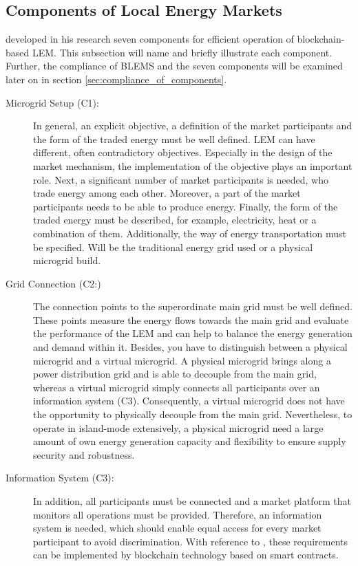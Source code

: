 \subsection{Components of Local Energy Markets}
\label{sec:components_of_local_energy_markets}
 developed in his research seven components for efficient
operation of blockchain-based LEM. This subsection will name and briefly 
illustrate each component. Further, the compliance of BLEMS and the seven components will be examined later on in section \ref{sec:compliance_of_components}.

\begin{description}
    \item[Microgrid Setup (C1):] In general, an explicit objective, a definition of the market 
     participants and the form of the traded energy must be well defined. 
     LEM can have different, often contradictory objectives. Especially in the
     design of the market mechanism, the implementation of the objective plays an important role.
     Next, a significant number of market participants is needed, who trade energy among each other.
     Moreover, a part of the market participants needs to be able to produce energy. 
     Finally, the form of the traded energy must be described, for example, electricity, heat or a 
     combination of them. Additionally, the way of energy transportation must be specified.
     Will be the traditional energy grid used or a physical microgrid build. 
    
    \item[Grid Connection (C2:)] The connection points to the superordinate main grid 
     must be well defined. These points measure the energy flows towards the main grid 
     and evaluate the performance of the LEM and can help to balance the energy generation 
     and demand within it. Besides, you have to distinguish between a physical microgrid and 
     a virtual microgrid. A physical microgrid brings along a power distribution grid and is able to
     decouple from the main grid, whereas a virtual microgrid simply connects all participants over 
     an information system (C3). Consequently, a virtual microgrid does not have the opportunity
     to physically decouple from the main grid. 
     Nevertheless, to operate in island-mode extensively, a physical microgrid need a large 
     amount of own energy generation capacity and flexibility to ensure supply security and robustness.
         
    \item[Information System (C3):] In addition, all participants must be connected 
    and a market platform that monitors all operations must be provided. 
    Therefore, an information system is needed, which should enable equal 
    access for every market participant to avoid discrimination. 
    With reference to , these requirements
    can be implemented by blockchain technology based on smart contracts.
    

\end{description}
